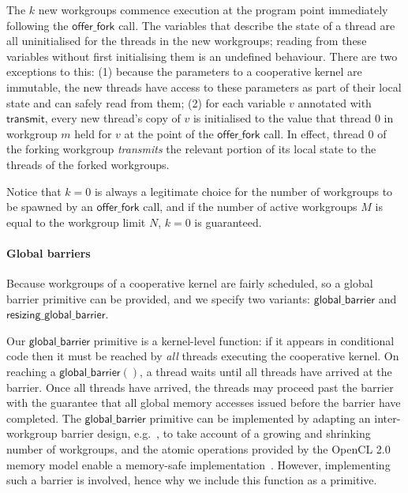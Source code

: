\documentclass[numbers,nocopyrightspace,10pt]{sigplanconf}
\newcommand{\mysec}{Sec.~}
\newcommand{\transmit}{\mathsf{transmit}}
\newcommand{\offerfork}{\mathsf{offer\_fork}}
\newcommand{\globalbarrier}{\mathsf{global\_barrier}}
\newcommand{\resizingglobalbarrier}{\mathsf{resizing\_global\_barrier}}
\begin{document}
The $k$ new workgroups commence execution at the program point
immediately following the $\offerfork$ call.  The variables that
describe the state of a thread are all uninitialised for the threads
in the new workgroups; reading from these variables without first
initialising them is an undefined behaviour.  There are two exceptions
to this: (1) because the parameters to a cooperative kernel are
immutable, the new threads have access to these parameters as part of
their local state and can safely read from them; (2) for each variable
$v$ annotated with $\transmit$, every new thread's copy of $v$ is
initialised to the value that thread 0 in workgroup $m$ held for $v$
at the point of the $\offerfork$ call.
%
In effect, thread 0 of the forking workgroup \emph{transmits} the relevant
portion of its local state to the threads of the forked workgroups.


Notice that $k=0$ is always a legitimate choice for the number of
workgroups to be spawned by an $\offerfork$ call, and if the number of
active workgroups $M$ is equal to the workgroup limit $N$, $k=0$ is
guaranteed.

\paragraph{Global barriers}

Because workgroups of a cooperative kernel are fairly scheduled, so a
global barrier primitive can be provided, and we specify two variants: $\globalbarrier$
and $\resizingglobalbarrier$.

Our $\globalbarrier$ primitive is a kernel-level function: if it
appears in conditional code then it must be reached by \emph{all}
threads executing the cooperative kernel.  On reaching a
$\globalbarrier()$, a thread waits until all threads have arrived at
the barrier.  Once all threads have arrived, the threads may proceed
past the barrier with the guarantee that all global memory accesses
issued before the barrier have completed.  The $\globalbarrier$
primitive can be implemented by adapting an inter-workgroup barrier
design, e.g.~\cite{XF10}, to take account of a growing and shrinking number of workgroups, and the atomic operations provided by
the OpenCL 2.0 memory model enable a memory-safe
implementation~\cite{DBLP:conf/oopsla/SorensenDBGR16}.  However, implementing such a barrier is
involved, hence why we include this function as a primitive.
\end{document}
